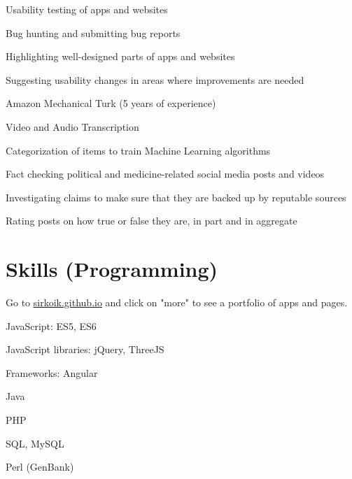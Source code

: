 \documentclass[]{deedy-resume-openfont}
\begin{document}
\begin{tightemize}
\item Usability testing of apps and websites
\item Bug hunting and submitting bug reports
\item Highlighting well-designed parts of apps and websites
\item Suggesting usability changes in areas where improvements are needed
\end{tightemize}
\sectionsep

\begin{tightemize}
\item Amazon Mechanical Turk (5 years of experience)
\item Video and Audio Transcription
\item Categorization of items to train Machine Learning algorithms
\end{tightemize}
\sectionsep

\begin{tightemize}
\item Fact checking political and medicine-related social media posts and videos
\item Investigating claims to make sure that they are backed up by reputable sources
\item Rating posts on how true or false they are, in part and in aggregate
\end{tightemize}
\sectionsep

\newpage

\section{Skills (Programming)}
Go to \href{https://sirkoik.github.io}{\underline{sirkoik.github.io}} and click on "more" to see a portfolio of apps and pages.
\sectionsep

\descript{}
\begin{tightemize}
\item JavaScript: ES5, ES6
\item JavaScript libraries: jQuery, ThreeJS
\item Frameworks: Angular
\item Java
\item PHP
\item SQL, MySQL
\item Perl (GenBank)
\end{tightemize}
\sectionsep
\end{document}
